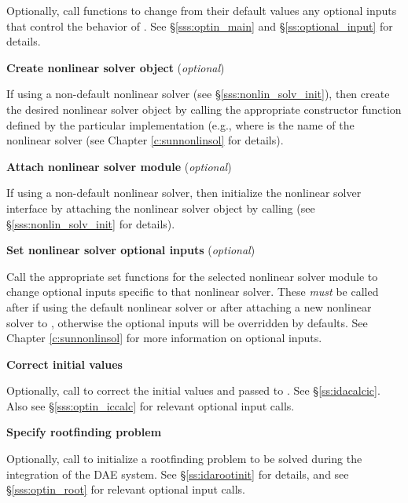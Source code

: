 \begin{Steps}
  Optionally, call  functions to change from their default values any
  optional inputs that control the behavior of {\ida}.
  See \S\ref{sss:optin_main} and \S\ref{ss:optional_input} for details.

\item\label{i:nonlin_solver}
  {\bf Create nonlinear solver object} (\textit{optional})

  If using a non-default nonlinear solver (see \S\ref{sss:nonlin_solv_init}),
  then create the desired nonlinear solver object by calling the appropriate
  constructor function defined by the particular {\sunnonlinsol} implementation
  (e.g.,  where \id{***} is the name of the
  nonlinear solver (see Chapter \ref{c:sunnonlinsol} for details).

\item\label{i:nonlin_solver_interface}
  {\bf Attach nonlinear solver module} (\textit{optional})

  If using a non-default nonlinear solver, then initialize the nonlinear solver
  interface by attaching the nonlinear solver object by calling
   (see
  \S\ref{sss:nonlin_solv_init} for details).

\item
  {\bf Set nonlinear solver optional inputs} (\textit{optional})

  Call the appropriate set functions for the selected nonlinear solver module to
  change optional inputs specific to that nonlinear solver. These \textit{must}
  be called after  if using the default nonlinear solver or after
  attaching a new nonlinear solver to {\ida}, otherwise the optional inputs will
  be overridden by {\ida} defaults. See Chapter \ref{c:sunnonlinsol} for more
  information on optional inputs.

\item
  {\bf Correct initial values}

  Optionally, call  to correct the initial values
   and  passed to .  See \S\ref{ss:idacalcic}.
  Also see \S\ref{sss:optin_iccalc} for relevant optional input calls.

\item
  {\bf Specify rootfinding problem}

  Optionally, call  to initialize a rootfinding problem
  to be solved during the integration of the DAE system.
  See \S\ref{ss:idarootinit} for details, and see \S\ref{sss:optin_root}
  for relevant optional input calls.


\end{Steps}
